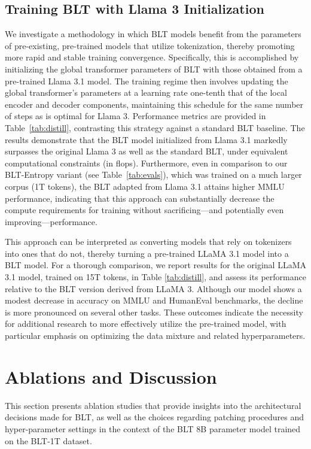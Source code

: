 \subsection{Training {\textsc BLT} with Llama 3 Initialization}
\label{sec:distillation}
We investigate a methodology in which {\textsc BLT} models benefit from the parameters of pre-existing, pre-trained models that utilize tokenization, thereby promoting more rapid and stable training convergence. Specifically, this is accomplished by initializing the global transformer parameters of {\textsc BLT} with those obtained from a pre-trained Llama 3.1 model. The training regime then involves updating the global transformer's parameters at a learning rate one-tenth that of the local encoder and decoder components, maintaining this schedule for the same number of steps as is optimal for Llama 3. Performance metrics are provided in Table~\ref{tab:distill}, contrasting this strategy against a standard {\textsc BLT} baseline. The results demonstrate that the {\textsc BLT} model initialized from Llama 3.1 markedly surpasses the original Llama 3 as well as the standard {\textsc BLT}, under equivalent computational constraints (in flops). Furthermore, even in comparison to our {\textsc BLT}-Entropy variant (see Table~\ref{tab:evals}), which was trained on a much larger corpus (1T tokens), the {\textsc BLT} adapted from Llama 3.1 attains higher MMLU performance, indicating that this approach can substantially decrease the compute requirements for training without sacrificing—and potentially even improving—performance.

This approach can be interpreted as converting models that rely on tokenizers into ones that do not, thereby turning a pre-trained LLaMA 3.1 model into a {\textsc BLT} model. For a thorough comparison, we report results for the original LLaMA 3.1 model, trained on 15T tokens, in Table \ref{tab:distill}, and assess its performance relative to the {\textsc BLT} version derived from LLaMA 3. Although our model shows a modest decrease in accuracy on MMLU and HumanEval benchmarks, the decline is more pronounced on several other tasks. These outcomes indicate the necessity for additional research to more effectively utilize the pre-trained model, with particular emphasis on optimizing the data mixture and related hyperparameters.

\section{Ablations and Discussion}
\label{section:ablations}
This section presents ablation studies that provide insights into the architectural decisions made for {\textsc BLT}, as well as the choices regarding patching procedures and hyper-parameter settings in the context of the {\textsc BLT} 8B parameter model trained on the {\textsc BLT}-1T dataset.

